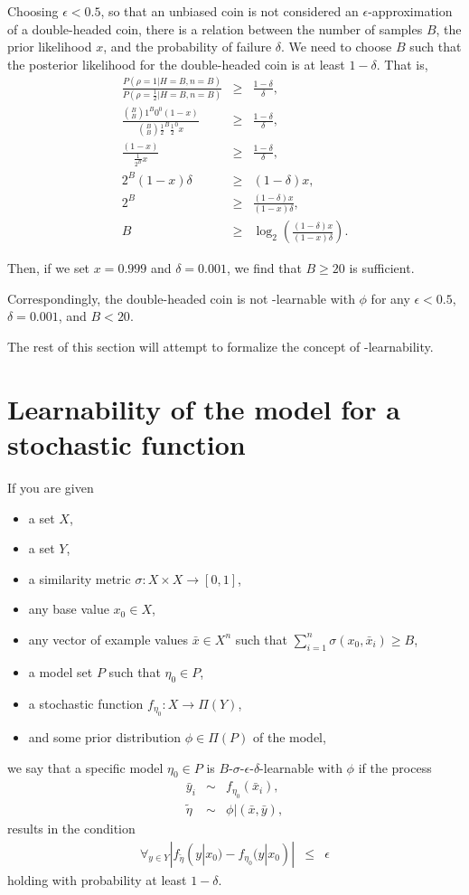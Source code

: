 Choosing $\epsilon<0.5$, so that an unbiased coin is not considered an $\epsilon$-approximation of a double-headed coin, there is a relation between the number of samples $B$, the prior likelihood $x$, and the probability of failure $\delta$. We need to choose $B$ such that the posterior likelihood for the double-headed coin is at least $1-\delta$. That is,
\begin{eqnarray}
\frac
 {P(\rho=1|H=B,n=B)}
 {P(\rho=\frac{1}{2}|H=B,n=B)}
&\geq&
\frac
 {1-\delta}
 {\delta},\\
\frac
 {{B \choose B}1^B0^0 (1-x)} 
 {{B \choose B}{\frac{1}{2}}^B{\frac{1}{2}}^0 x}
&\geq&
\frac
 {1-\delta}
 {\delta},\\
\frac
 {(1-x)} 
 {{\frac{1}{2^B}} x}
&\geq&
\frac
 {1-\delta}
 {\delta},\\
 2^B(1-x)\delta 
 &\geq&
 (1-\delta)x,\\
 2^B 
 &\geq&
\frac
 {(1-\delta)x}
 {(1-x)\delta},\\
%
B &\geq& \log_2\left(\frac
 {(1-\delta)x}
 {(1-x)\delta}
 \right).
\end{eqnarray}

Then, if we set $x=0.999$ and $\delta=0.001$, we find that $B\geq20$ is sufficient.

Correspondingly, the double-headed coin is not \bed-learnable with $\phi$ for any $\epsilon<0.5$, $\delta=0.001$, and $B<20$.

The rest of this section will attempt to formalize the concept of \bed-learnability.

\section{Learnability of the model for a stochastic function}

If you are given
\begin{itemize}
\item a set $X$,
\item a set $Y$,
\item a similarity metric $\sigma:X\times X\rightarrow[0,1]$,
\item any base value $x_0\in X$,
\item any vector of example values $\bar x \in X^n$ such that $\sum_{i=1}^n \sigma(x_0, \bar x_i) \geq B$,
\item a model set $P$ such that $\eta_0 \in P$,
\item a stochastic function $f_{\eta_0}:X\rightarrow\Pi(Y)$,
\item and some prior distribution $\phi \in \Pi(P)$ of the model,
\end{itemize}
we say that a specific model $\eta_0 \in P$ is $B$-$\sigma$-$\epsilon$-$\delta$-learnable with $\phi$ if the process
\begin{eqnarray}
\bar y_i &\sim& f_{\eta_0}(\bar x_i),\\
\tilde\eta &\sim& \phi|(\bar x, \bar y),
\end{eqnarray}
results in the condition
\begin{eqnarray}
\forall_{y\in Y}|f_{\tilde\eta}(y|x_0)-f_{\eta_0}(y|x_0)| &\leq& \epsilon
\end{eqnarray}
holding with probability at least $1-\delta$.

